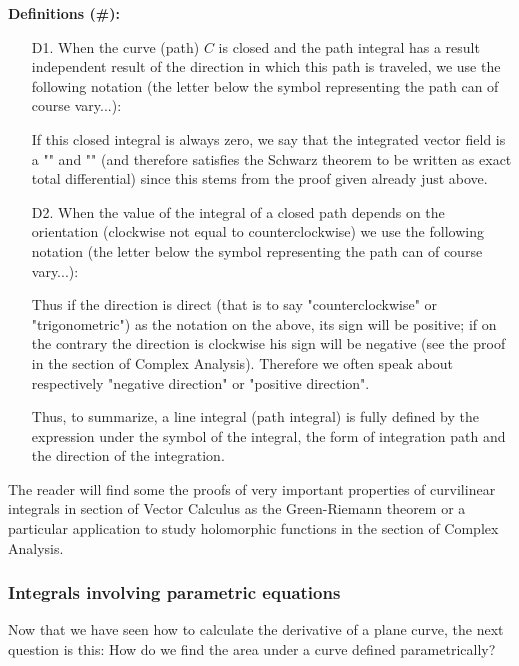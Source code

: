 	\textbf{Definitions (\#\mydef):}
	\begin{enumerate}
		\item[D1.] When the curve (path) $C$ is closed and the path integral has a result independent result of the direction in which this path is traveled, we use the following notation (the letter below the symbol representing the path can of course vary...):
		
		If this closed integral is always zero, we say that the integrated vector field is a "" and "" (and therefore satisfies the Schwarz theorem to be written as exact total differential) since this stems from the proof given already just above.
		
		\item[D2.] When the value of the integral of a closed path depends on the orientation (clockwise not equal to counterclockwise) we use the following notation (the letter below the symbol representing the path can of course vary...):
		
		Thus if the direction is direct (that is to say "counterclockwise" or "trigonometric") as the notation on the above, its sign will be positive; if on the contrary the direction is clockwise his sign will be negative (see the proof in the section of Complex Analysis). Therefore we often speak about respectively "negative direction" or "positive direction".
		
		Thus, to summarize, a line integral (path integral) is fully defined by the expression under the symbol of the integral, the form of integration path and the direction of the integration.
	\end{enumerate}
	\begin{tcolorbox}[title=Remark,colframe=black,arc=10pt]
	The reader will find some the proofs of very important properties of curvilinear integrals  in section of Vector Calculus as the Green-Riemann theorem or a particular application to study holomorphic functions in the section of Complex Analysis.
	\end{tcolorbox}
	
	\subsubsection{Integrals involving parametric equations}
	Now that we have seen how to calculate the derivative of a plane curve, the next question is this: How do we find the area under a curve defined parametrically? 
	
